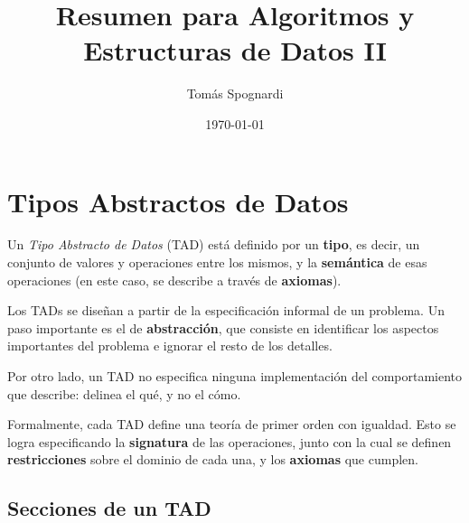 \documentclass{article}
\title{Resumen para Algoritmos y Estructuras de Datos II}
\author{Tomás Spognardi}
\date{\today}
\begin{document}
\maketitle

\tableofcontents

\newpage

\section{Tipos Abstractos de Datos}

Un \textit{Tipo Abstracto de Datos} (TAD) está definido por un \textbf{tipo}, es decir, un conjunto de valores y operaciones entre los mismos, y la \textbf{semántica} de esas operaciones (en este caso, se describe a través de \textbf{axiomas}).

Los TADs se diseñan a partir de la especificación informal de un problema. Un paso importante es el de \textbf{abstracción}, que consiste en identificar los aspectos importantes del problema e ignorar el resto de los detalles.

Por otro lado, un TAD no especifica ninguna implementación del comportamiento que describe: delinea el qué, y no el cómo.

Formalmente, cada TAD define una teoría de primer orden con igualdad. Esto se logra especificando la \textbf{signatura} de las operaciones, junto con la cual se definen \textbf{restricciones} sobre el dominio de cada una, y los \textbf{axiomas} que cumplen.

\subsection{Secciones de un TAD}
\end{document}
